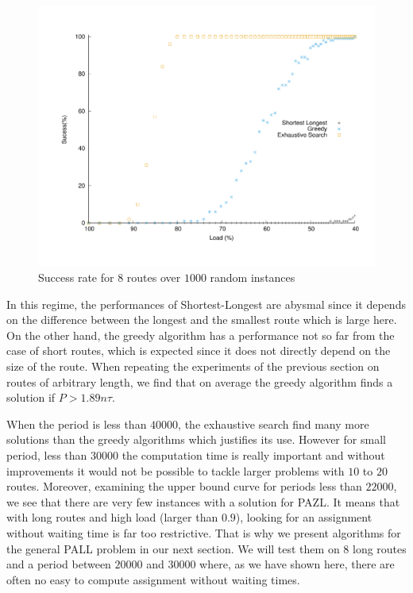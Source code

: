 \documentclass[a4paper,10pt]{article}
\begin{document}
\begin{figure}

       \begin{center}
      \includegraphics[scale=0.4]{echec_longues.pdf}
      \end{center}
      \caption{Success rate for $8$ routes over $1000$ random instances}
     \end{figure}
      
      In this regime, the performances of Shortest-Longest are abysmal since it depends on the difference between the longest and the smallest route which is large here. On the other hand, the greedy algorithm has a performance not so far from the case of short routes, which is expected since it does not directly depend on the size of the route. When repeating the experiments of the previous section on routes of arbitrary length, we find that on average the greedy algorithm finds a solution if $P>1.89n\tau$.
      
      When the period is less than $40000$, the exhaustive search find many more solutions than the greedy algorithms which justifies its use. However for small period, less than $30000$ the computation time is really important and without improvements it would not be possible to tackle larger problems with $10$ to $20$ routes. Moreover, examining the upper bound curve for periods less than $22000$, we see that there are very few instances with a solution for PAZL. It means that with long routes and high load (larger than $0.9$), looking for an assignment without waiting time is far too restrictive. That is why we present algorithms for the general PALL problem in our next section. We will test them on $8$ long routes and a period between $20000$ and $30000$ where, as we have shown here, there are often no easy to compute assignment without waiting times.
      
\end{document}
